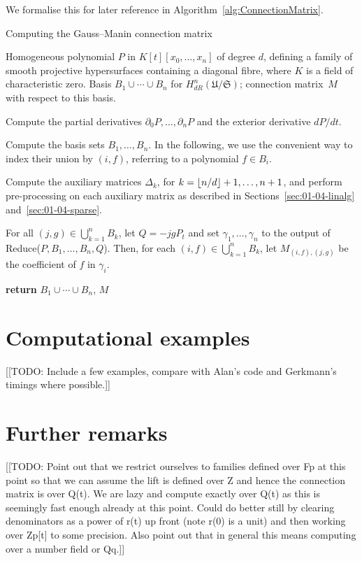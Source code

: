 We formalise this for later reference in Algorithm~\ref{alg:ConnectionMatrix}.

\begin{algorithm}
\caption{Computing the Gauss--Manin connection matrix}
\label{alg:ConnectionMatrix}
\begin{algorithmic}
\Require Homogeneous polynomial $P$ in $K[t][x_0, \dotsc, x_n]$ of degree $d$, 
         defining a family of smooth projective hypersurfaces containing 
         a diagonal fibre, where $K$ is a field of characteristic zero.
\Ensure  Basis $B_1 \cup \dotsb \cup B_n$ for 
         $H_{dR}^n(\mathfrak{U}/\mathfrak{S})$;  connection matrix~$M$ with 
         respect to this basis.
\State \begin{compactenum}[\it {Step} I.] \vspace{-1.24em}
\item Compute the partial derivatives $\partial_0 P, \dotsc, \partial_n P$ and 
      the exterior derivative $dP/dt$.
\item Compute the basis sets $B_1, \dotsc, B_n$.  In the following, we use the 
      convenient way to index their union by $(i,f)$, referring to a 
      polynomial $f \in B_i$.
\item Compute the auxiliary matrices $\Delta_k$, for 
      $k = \left\lfloor n/d\right\rfloor+1, \dotsc, n+1$, and perform pre-processing on each 
      auxiliary matrix as described in 
      Sections~\ref{sec:01-04-linalg} 
      and~\ref{sec:01-04-sparse}.
\item For all $(j, g) \in \bigcup_{k=1}^n B_k$, let $Q = -j g P_t$ and set 
      $\gamma_{1}, \dotsc, \gamma_n$ to the output of 
      {\sc Reduce($P, B_1, \dotsc, B_n, Q$)}.  
      Then, for each $(i, f) \in \bigcup_{k=1}^n B_k$, let $M_{(i,f),(j,g)}$ 
      be the coefficient of $f$ in $\gamma_i$.
\item \textbf{return} $B_1 \cup \dotsb \cup B_n$, $M$
\end{compactenum}
\EndProcedure
\end{algorithmic}
\end{algorithm}

\section{Computational examples}

[[TODO:  Include a few examples, compare with Alan's code and 
Gerkmann's timings where possible.]]

\section{Further remarks}

[[TODO:  Point out that we restrict ourselves to families defined 
over Fp at this point so that we can assume the lift is defined 
over Z and hence the connection matrix is over Q(t).  We are lazy 
and compute exactly over Q(t) as this is seemingly fast enough 
already at this point.  Could do better still by clearing denominators 
as a power of r(t) up front (note r(0) is a unit) and then working 
over Zp[t] to some precision.  Also point out that in general this 
means computing over a number field or Qq.]]

